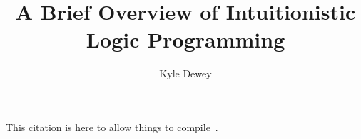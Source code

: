 \documentclass{scrartcl}
\begin{document}
\title{A Brief Overview of Intuitionistic Logic Programming}
\author{Kyle Dewey}

\maketitle



This citation is here to allow things to compile~\cite{McCartyS94}.



\end{document}

